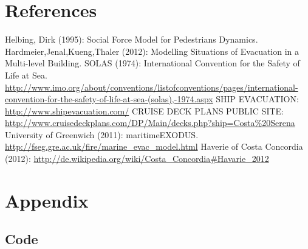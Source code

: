 \documentclass[11pt]{article}
\begin{document}
\section{References}
\begin{thebibliography}{9}
 Helbing, Dirk (1995): Social Force Model for Pedestrians Dynamics.
 Hardmeier,Jenal,Kueng,Thaler (2012): Modelling Situations of Evacuation in a Multi-level Building.
 SOLAS (1974): International Convention for the Safety of Life at Sea. \url{http://www.imo.org/about/conventions/listofconventions/pages/international-convention-for-the-safety-of-life-at-sea-(solas),-1974.aspx}
 SHIP EVACUATION: \url{http://www.shipevacuation.com/}
 CRUISE DECK PLANS PUBLIC SITE: \url{http://www.cruisedeckplans.com/DP/Main/decks.php?ship=Costa%20Serena}
 University of Greenwich (2011):  maritimeEXODUS. \url{http://fseg.gre.ac.uk/fire/marine_evac_model.html}
 Haverie of Costa Concordia (2012): \url{http://de.wikipedia.org/wiki/Costa_Concordia#Havarie_2012}
	
\end{thebibliography}
\section{Appendix}
\subsection{Code}


\end{document}
